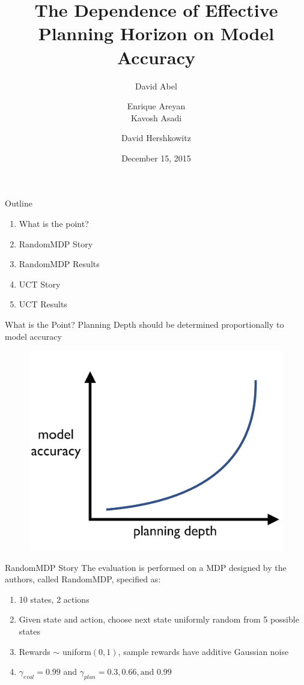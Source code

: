 \documentclass{beamer}
\title[The Dependence of Planning Horizon on Model Accuracy]{The Dependence of Effective Planning Horizon on Model Accuracy}
\author[]{David Abel  \and Enrique Areyan \\ Kavosh Asadi  \and David Hershkowitz}
\date{December 15, 2015}
\begin{document}
\begin{frame}
\titlepage
\end{frame}

\begin{frame}{Outline}
\begin{enumerate}
	\item What is the point?
	\item RandomMDP Story
	\item RandomMDP Results
	\item UCT Story
	\item UCT Results
\end{enumerate}
\end{frame}

\begin{frame}{What is the Point?}
\centering
Planning Depth should be determined proportionally to model accuracy
\begin{figure}
\includegraphics[page=1,width=.5\textwidth]{WhatIsThePoint.png}
\end{figure}
\end{frame}


\begin{frame}{RandomMDP Story}
The evaluation is performed on a MDP designed by the authors, called RandomMDP, specified as:\vspace{8mm}
\begin{enumerate}
\setlength\itemsep{1em}
\item 10 states, 2 actions 
\item Given state and action, choose next state uniformly random from 5 possible states
\item Rewards $\sim$ uniform$(0,1)$, sample rewards have additive Gaussian noise
\item $\gamma_{eval} = 0.99$ and $\gamma_{plan} = 0.3,0.66, \text{and } 0.99$
\end{enumerate}

\end{frame}
\end{document}
